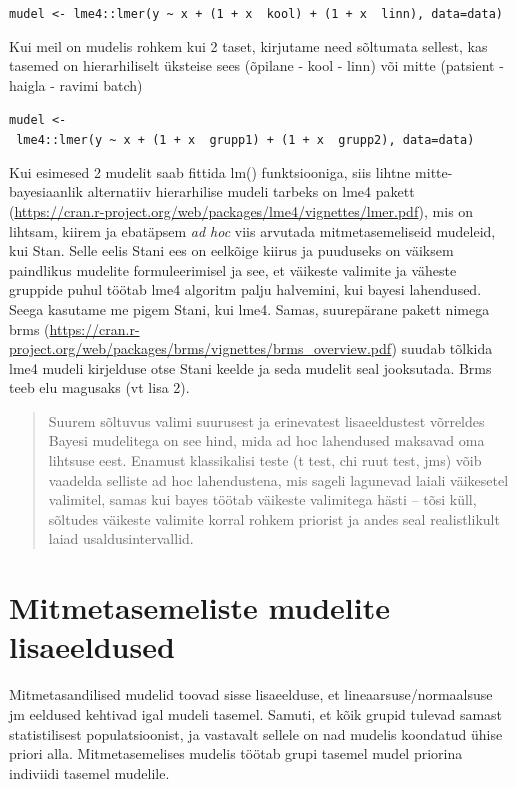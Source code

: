 \documentclass[]{book}
\begin{document}
\texttt{mudel\ \textless{}-\ lme4::lmer(y\ \textasciitilde{}\ x\ +\ (1\ +\ x\ \textbar{}\ kool)\ +\ (1\ +\ x\ \textbar{}\ linn),\ data=data)}

Kui meil on mudelis rohkem kui 2 taset, kirjutame need sõltumata
sellest, kas tasemed on hierarhiliselt üksteise sees (õpilane - kool -
linn) või mitte (patsient - haigla - ravimi batch)

\texttt{mudel\ \textless{}-\ lme4::lmer(y\ \textasciitilde{}\ x\ +\ (1\ +\ x\ \textbar{}\ grupp1)\ +\ (1\ +\ x\ \textbar{}\ grupp2),\ data=data)}

Kui esimesed 2 mudelit saab fittida lm() funktsiooniga, siis lihtne
mitte-bayesiaanlik alternatiiv hierarhilise mudeli tarbeks on lme4
pakett
(\url{https://cran.r-project.org/web/packages/lme4/vignettes/lmer.pdf}),
mis on lihtsam, kiirem ja ebatäpsem \emph{ad hoc} viis arvutada
mitmetasemeliseid mudeleid, kui Stan. Selle eelis Stani ees on eelkõige
kiirus ja puuduseks on väiksem paindlikus mudelite formuleerimisel ja
see, et väikeste valimite ja väheste gruppide puhul töötab lme4 algoritm
palju halvemini, kui bayesi lahendused. Seega kasutame me pigem Stani,
kui lme4. Samas, suurepärane pakett nimega brms
(\url{https://cran.r-project.org/web/packages/brms/vignettes/brms_overview.pdf})
suudab tõlkida lme4 mudeli kirjelduse otse Stani keelde ja seda mudelit
seal jooksutada. Brms teeb elu magusaks (vt lisa 2).

\begin{quote}
Suurem sõltuvus valimi suurusest ja erinevatest lisaeeldustest võrreldes
Bayesi mudelitega on see hind, mida ad hoc lahendused maksavad oma
lihtsuse eest. Enamust klassikalisi teste (t test, chi ruut test, jms)
võib vaadelda selliste ad hoc lahendustena, mis sageli lagunevad laiali
väikesetel valimitel, samas kui bayes töötab väikeste valimitega hästi
-- tõsi küll, sõltudes väikeste valimite korral rohkem priorist ja andes
seal realistlikult laiad usaldusintervallid.
\end{quote}

\section{Mitmetasemeliste mudelite
lisaeeldused}\label{mitmetasemeliste-mudelite-lisaeeldused}

Mitmetasandilised mudelid toovad sisse lisaeelduse, et
lineaarsuse/normaalsuse jm eeldused kehtivad igal mudeli tasemel.
Samuti, et kõik grupid tulevad samast statistilisest populatsioonist, ja
vastavalt sellele on nad mudelis koondatud ühise priori alla.
Mitmetasemelises mudelis töötab grupi tasemel mudel priorina indiviidi
tasemel mudelile.
\end{document}
